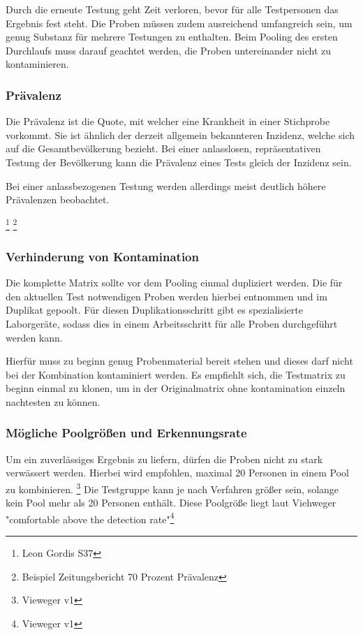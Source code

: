 Durch die erneute Testung geht Zeit verloren, bevor für alle Testpersonen das Ergebnis fest steht.
Die Proben müssen zudem ausreichend umfangreich sein, um genug Substanz für mehrere Testungen zu enthalten.
Beim Pooling des ersten Durchlaufs muss darauf geachtet werden, die Proben untereinander nicht zu kontaminieren.

\subsubsection{Prävalenz}
Die Prävalenz ist die Quote, mit welcher eine Krankheit in einer Stichprobe vorkommt.
Sie ist ähnlich der derzeit allgemein bekannteren Inzidenz, welche sich auf die Gesamtbevölkerung bezieht.
Bei einer anlasslosen, repräsentativen Testung der Bevölkerung kann die Prävalenz eines Tests gleich der Inzidenz sein.

Bei einer anlassbezogenen Testung werden allerdings meist deutlich höhere Prävalenzen beobachtet.

\footnote{Leon Gordis S37}
\footnote{Beispiel Zeitungsbericht 70 Prozent Prävalenz}


\subsubsection{Verhinderung von Kontamination}
Die komplette Matrix sollte vor dem Pooling einmal dupliziert werden. 
Die für den aktuellen Test notwendigen Proben werden hierbei entnommen und im Duplikat gepoolt.
Für diesen Duplikationsschritt gibt es spezialisierte Laborgeräte, sodass dies in einem Arbeitsschritt für alle Proben durchgeführt werden kann.

Hierfür muss zu beginn genug Probenmaterial bereit stehen und dieses darf nicht bei der Kombination kontaminiert werden.
Es empfiehlt sich, die Testmatrix zu beginn einmal zu klonen, um in der Originalmatrix ohne kontamination einzeln nachtesten zu können.

\subsubsection{Mögliche Poolgrößen und Erkennungsrate}
Um ein zuverlässiges Ergebnis zu liefern, dürfen die Proben nicht zu stark verwässert werden.
Hierbei wird empfohlen, maximal 20 Personen in einem Pool zu kombinieren. \footnote{Vieweger v1}
Die Testgruppe kann je nach Verfahren größer sein, solange kein Pool mehr als 20 Personen enthält.
Diese Poolgröße liegt laut Viehweger "comfortable above the detection rate"\footnote{Vieweger v1}

